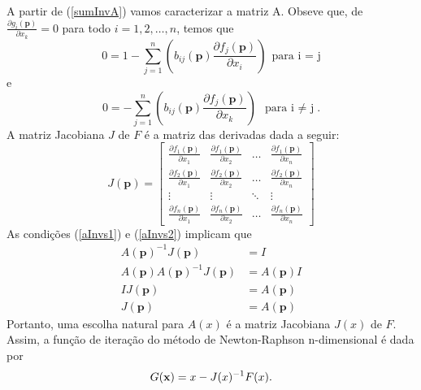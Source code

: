 A partir de (\ref{sumInvA}) vamos caracterizar a matriz A. Obseve que, de \(
\frac{\partial g_i(\mathbf{p})}{\partial x_k} = 0 \) para todo $ i = 1,2,
    \ldots, n$, temos que
\begin{equation}\label{aInvs1}
    0 = 1 - \sum_{j=1}^{n} \left( b_{ij}(\mathbf{p}) \frac{\partial f_j(\mathbf{p})}{\partial x_i} \right) \ \ \text{para i = j}
\end{equation}
e
\begin{equation}\label{aInvs2}
    0 = - \sum_{j=1}^{n} \left( b_{ij}(\mathbf{p}) \frac{\partial f_j(\mathbf{p})}{\partial x_k} \right)\ \ \text{para i $\neq$ j}.
\end{equation}
A matriz Jacobiana \(J\) de \(F\) é a matriz das derivadas dada a seguir:
\begin{equation}
    J(\mathbf{p}) =
    \begin{bmatrix}
        \frac{\partial f_1(\mathbf{p})}{\partial x_1} & \frac{\partial f_1(\mathbf{p})}{\partial x_2} & \ldots & \frac{\partial f_1(\mathbf{p})}{\partial x_n} \\
        \frac{\partial f_2(\mathbf{p})}{\partial x_1} & \frac{\partial f_2(\mathbf{p})}{\partial x_2} & \ldots & \frac{\partial f_2(\mathbf{p})}{\partial x_n} \\
        \vdots                                        & \vdots                                        & \ddots & \vdots                                        \\
        \frac{\partial f_n(\mathbf{p})}{\partial x_1} & \frac{\partial f_n(\mathbf{p})}{\partial x_2} & \ldots & \frac{\partial f_n(\mathbf{p})}{\partial x_n}
    \end{bmatrix}
\end{equation}
As condições (\ref{aInvs1}) e (\ref{aInvs2}) implicam que
\begin{align*}
    A(\mathbf{p})^{-1} J(\mathbf{p})               & = I               \\[6pt]
    A(\mathbf{p}) A(\mathbf{p})^{-1} J(\mathbf{p}) & = A(\mathbf{p}) I \\[6pt]
    I J(\mathbf{p})                                & = A(\mathbf{p})   \\[6pt]
    J(\mathbf{p})                                  & = A(\mathbf{p})
\end{align*}
Portanto, uma escolha natural para \(A(x)\) é a matriz Jacobiana \(J(x)\) de \(F\). Assim, a função de iteração do método de Newton-Raphson n-dimensional é dada por
\begin{equation}
    G(\textbf{x}) = x - J(x)^{-1} F(x).
\end{equation}
